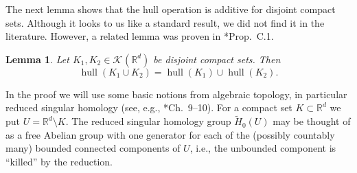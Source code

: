 \documentclass[12pt]{paper}
\numberwithin{equation}{section}
\theoremstyle{plain}
\newtheorem{lemma}[theorem]{Lemma}
\theoremstyle{definition}
\newcommand{\Rd}{\mathbb{R}^{d}}
\newcommand{\vietoris}[2][]{\mathcal{K}_{#1}(#2)}
\renewcommand{\tilde}{\widetilde}
\DeclareMathOperator{\hull}{\mathrm{hull}}
\begin{document}
The next lemma shows that the hull operation is additive for disjoint compact sets.
Although it looks to us like a standard result, we did not find it in the literature.
However, a related lemma was proven in \cite{BergerEtAlCMP}*{Prop.~C.1}.

\begin{lemma}
  \label{lem:topological-hull-union-two}
  Let \(K_{1}, K_{2} \in \vietoris{\Rd}\) be disjoint compact sets. Then
  \[
  \hull(K_{1} \cup K_{2}) = \hull(K_{1}) \cup \hull(K_{2}).
  \]
\end{lemma}

In the proof we will use some basic notions from algebraic topology, in
particular reduced singular homology (see, e.g.,
\cite{VassilievIntroTopology}*{Ch.~9--10}). For a compact set \(K\subset\Rd\) we put \(U=\Rd\setminus K\).
The reduced singular homology group \(\tilde{H}_{0}(U)\) may be thought of as a free Abelian group with one
generator for each of the (possibly countably many) bounded connected components of \(U\), i.e.,
the unbounded component is ``killed'' by the reduction.
\end{document}
